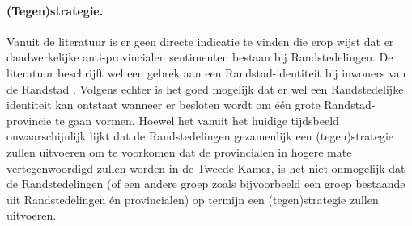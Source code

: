 \paragraph{(Tegen)strategie.}
Vanuit de literatuur is er geen directe indicatie te vinden die erop wijst dat er daadwerkelijke anti-provincialen sentimenten bestaan bij Randstedelingen. De literatuur beschrijft wel een gebrek aan een Randstad-identiteit bij inwoners van de Randstad \citep{meijers2001deltametropool,terlouw2010randstad}. Volgens \cite{terlouw2010randstad} echter is het goed mogelijk dat er wel een Randstedelijke identiteit kan ontstaat wanneer er besloten wordt om één grote Randstad-provincie te gaan vormen. Hoewel het vanuit het huidige tijdsbeeld onwaarschijnlijk lijkt dat de Randstedelingen gezamenlijk een (tegen)strategie zullen uitvoeren om te voorkomen dat de provincialen in hogere mate vertegenwoordigd zullen worden in de Tweede Kamer, is het niet onmogelijk dat de Randstedelingen (of een andere groep zoals bijvoorbeeld een groep bestaande uit Randstedelingen én provincialen) op termijn een (tegen)strategie zullen uitvoeren. 


